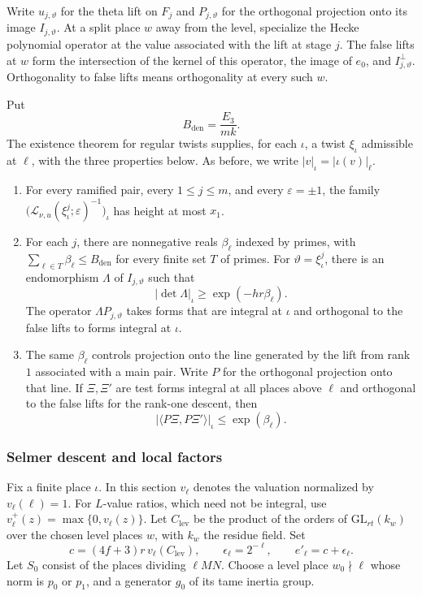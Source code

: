 Write \(u_{j,\vartheta}\) for the theta lift on \(F_j\) and
\(P_{j,\vartheta}\) for the orthogonal projection onto its image
\(I_{j,\vartheta}\). At a split place \(w\) away from the level, specialize
the Hecke polynomial operator at the value associated with the lift at
stage \(j\). The false lifts at \(w\) form the intersection of the kernel
of this operator, the image of \(e_0\), and \(I_{j,\vartheta}^{\perp}\).
Orthogonality to false lifts means orthogonality at every such \(w\).

Put
\[
 B_{\mathrm{den}}=\frac{E_3}{mk}.
\]
The existence theorem for regular twists supplies, for each \(\iota\),
a twist \(\xi_\iota\) admissible at \(\ell\), with the three properties
below. As before, we write \(|v|_\iota=|\iota(v)|_\ell\).
\begin{enumerate}
\item For every ramified pair, every \(1\le j\le m\), and every
  \(\varepsilon=\pm1\), the family
  \(\bigl(\mathcal L_{\nu,u}(\xi_\iota^j;\varepsilon)^{-1}\bigr)_\iota\)
  has height at most \(x_1\).
\item For each \(j\), there are nonnegative reals \(\beta_\ell\) indexed
  by primes, with \(\sum_{\ell\in T}\beta_\ell\le B_{\mathrm{den}}\) for
  every finite set \(T\) of primes. For \(\vartheta=\xi_\iota^j\), there
  is an endomorphism \(\Lambda\) of \(I_{j,\vartheta}\) such that
  \[
    |\det\Lambda|_\iota\ge\exp(-hr\beta_\ell).
  \]
  The operator \(\Lambda P_{j,\vartheta}\) takes forms that are integral
  at \(\iota\) and orthogonal to the false lifts to forms integral
  at \(\iota\).
\item The same \(\beta_\ell\) controls projection onto the line generated
  by the lift from rank \(1\) associated with a main pair. Write \(P\)
  for the orthogonal projection onto that line. If \(\Xi,\Xi'\) are
  test forms integral at all places above \(\ell\) and orthogonal to
  the false lifts for the rank-one descent, then
  \[
       |\langle P\Xi,P\Xi'\rangle|_\iota\le\exp(\beta_\ell).
  \]
\end{enumerate}

\subsubsection{Selmer descent and local factors}

Fix a finite place \(\iota\). In this section \(v_\ell\) denotes the
valuation normalized by \(v_\ell(\ell)=1\). For \(L\)-value ratios, which
need not be integral, use \(v_\ell^+(z)=\max\{0,v_\ell(z)\}\).
Let \(C_{\mathrm{lev}}\) be the product of the orders of
\(\mathrm{GL}_{rt}(k_w)\) over the chosen level places \(w\), with \(k_w\)
the residue field. Set
\[
 c=(4f+3)r\,v_\ell(C_{\mathrm{lev}}),\qquad
 \epsilon_\ell=2^{-\ell},\qquad e'_\ell=c+\epsilon_\ell .
\]
Let \(S_0\) consist of the places dividing \(\ell MN\). Choose a level
place \(w_0\nmid\ell\) whose norm is \(p_0\) or \(p_1\), and a generator
\(g_0\) of its tame inertia group.

